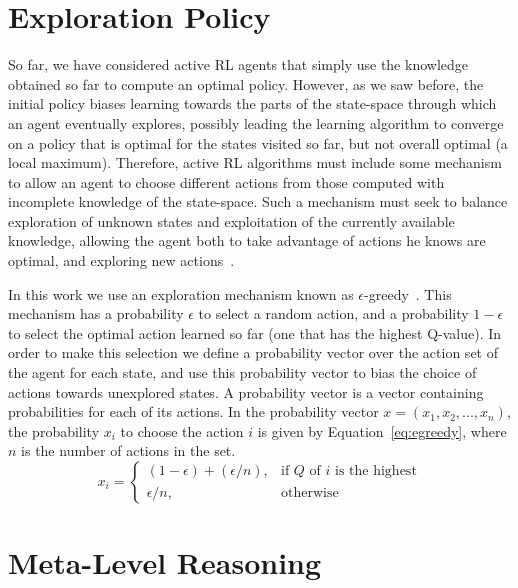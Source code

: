 \section{Exploration Policy}
\label{sec:exploration}

So far, we have considered active RL agents that simply use the knowledge obtained so far to compute an optimal policy. 
However, as we saw before, the initial policy biases learning towards the parts of the state-space through which an agent eventually explores, possibly leading the learning algorithm to converge on a policy that is optimal for the states visited so far, but not overall optimal (a local maximum). 
Therefore, active RL algorithms must include some mechanism to allow an agent to choose different actions from those computed with incomplete knowledge of the state-space. 
Such a mechanism must seek to balance exploration of unknown states and exploitation of the currently available knowledge, allowing the agent both to take advantage of actions he knows are optimal, and exploring new actions~\cite{amato2010highlevel}. 

In this work we use an exploration mechanism known as $\epsilon$-greedy~\cite{rodrigues2009dynamic}. 
This mechanism has a probability $\epsilon$ to select a random action, and a probability $1 - \epsilon$ to select the optimal action learned so far (one that has the highest Q-value).
In order to make this selection we define a probability vector over the action set of the agent for each state, and use this probability vector to bias the choice of actions towards unexplored states.
A probability vector is a vector containing probabilities for each of its actions.
In the probability vector $x = (x_1, x_2, ..., x_n)$, the probability $x_i$ to choose the action $i$ is given by Equation~\ref{eq:egreedy}, where $n$ is the number of actions in the set.
\begin{equation} \label{eq:egreedy}
	x_i = \left\{
  \begin{array}{ll}
    (1 - \epsilon) + (\epsilon / n), & \mbox{if $Q$ of $i$ is the highest} \\
    \epsilon / n, & \mbox{otherwise}
  \end{array}\right.
\end{equation}



\section{Meta-Level Reasoning}
\label{sec:meta-reasoning}

